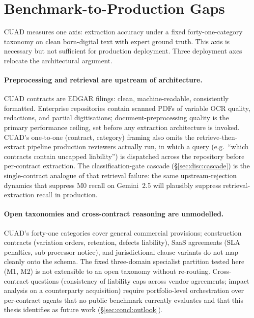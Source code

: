 \section{Benchmark-to-Production Gaps}\label{sec:disc:practitioner}

CUAD measures one axis: extraction accuracy under a fixed forty-one-category
taxonomy on clean born-digital text with expert ground truth. This axis is
necessary but not sufficient for production deployment. Three deployment axes
relocate the architectural argument.

\paragraph{Preprocessing and retrieval are upstream of architecture.}
CUAD contracts are EDGAR filings: clean, machine-readable, consistently
formatted. Enterprise repositories contain scanned PDFs of variable OCR
quality, redactions, and partial digitisations; document-preprocessing
quality is the primary performance ceiling, set before any extraction
architecture is invoked. CUAD's one-to-one (contract, category) framing
also omits the retrieve-then-extract pipeline production reviewers actually
run, in which a query (e.g.\ ``which contracts contain uncapped liability'')
is dispatched across the repository before per-contract extraction.
The classification-gate cascade (\S\ref{sec:disc:cascade}) is the
single-contract analogue of that retrieval failure: the same
upstream-rejection dynamics that suppress M0 recall on Gemini~2.5 will
plausibly suppress retrieval-extraction recall in production.

\paragraph{Open taxonomies and cross-contract reasoning are unmodelled.}
CUAD's forty-one categories cover general commercial provisions; construction
contracts (variation orders, retention, defects liability), SaaS agreements
(SLA penalties, sub-processor notice), and jurisdictional clause variants
do not map cleanly onto the schema. The fixed three-domain specialist
partition tested here (M1, M2) is not extensible to an open taxonomy without
re-routing. Cross-contract questions (consistency of liability caps
across vendor agreements; impact analysis on a counterparty acquisition)
require portfolio-level orchestration over per-contract agents that no
public benchmark currently evaluates and that this thesis identifies as
future work (\S\ref{sec:concl:outlook}).


